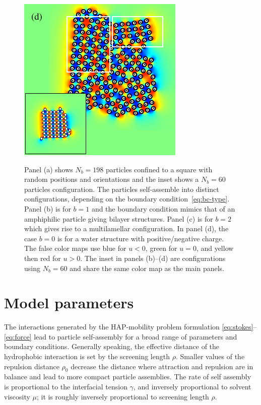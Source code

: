 \documentclass[prb,preprint,showpacs,preprintnumbers,amsmath,amssymb,longbibliography]{revtex4-1}
\begin{document}
\begin{figure}[h!]
\begin{center}
  \includegraphics[height=0.3\textheight]{Nb198d_eta_inset.pdf}
\end{center}
\begin{caption}{\label{fig:relax}
  Panel (a) shows $N_b = 198$ particles confined to a square with random
  positions and orientations and the inset shows a $N_b=60$ particles
  configuration. The particles self-assemble into distinct
  configurations, depending on the boundary
  condition~\eqref{eq:bc-type}. Panel (b) is for $b=1$ and the boundary
  condition mimics that of an amphiphilic particle giving bilayer
  structures. Panel (c) is for $b=2$ which gives rise to a
  multilamellar configuration. In panel (d), the case $b = 0$ is for a
  water structure with positive/negative charge. The false color maps
  use blue for $u < 0$, green for $u = 0$, and yellow then red for $u >
  0$. The inset in panels (b)--(d) are configurations using $N_b=60$ and
  share the same color map as the main panels.}
\end{caption}
\end{figure}

\section{Model parameters}
The interactions generated by the HAP-mobility problem formulation
\eqref{eq:stokes}--\eqref{eq:force}
lead to particle self-assembly for a broad range of parameters and
boundary conditions.  Generally speaking, the effective distance of the
hydrophobic interaction is set by the screening length $\rho$.
Smaller values of the repulsion distance $\rho_0$ decrease the distance
where attraction and repulsion are in balance and lead to more compact
particle assemblies. 
The rate of self assembly is proportional to the interfacial tension $\gamma$,
and inversely proportional to solvent viscosity $\mu$; it is
roughly inversely proportional to screening length $\rho.$
\end{document}
